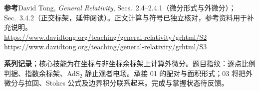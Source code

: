 \documentclass[11pt,a4paper]{article}
\begin{document}
\textbf{参考}\quad David Tong, \textit{General Relativity}, Secs.~2.4--2.4.1（微分形式与外微分）；Sec.~3.4.2（正交标架，延伸阅读）。正文计算与符号已独立核对，参考资料用于补充说明。\\
\url{https://www.davidtong.org/teaching/general-relativity/grhtml/S2}\\
\url{https://www.davidtong.org/teaching/general-relativity/grhtml/S3}

\textbf{系列记录}；核心技能为在坐标与非坐标余标架上计算外微分。题目指纹：逐点比例判据、指数余标架、AdS$_2$ 静止观者电场。承接 01 的配对与面积形式；03 将把外微分与拉回、Stokes 公式及边界积分联系起来。完成与掌握状态待反馈。
\end{document}
